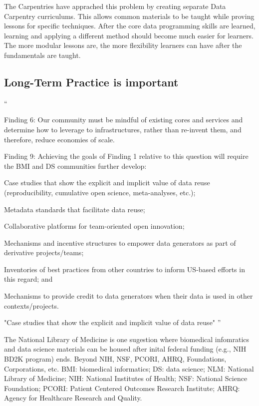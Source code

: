 \documentclass[030-workshop.tex]{subfiles}
\begin{document}
        The Carpentries have apprached this problem by creating separate Data Carpentry curriculums.
        This allows common materials to be taught while proving lessons for specific techniques.
        After the core data programming skills are learned,
        learning and applying a different method should become much easier for learners.
        The more modular lessons are, the more flexibility learners can have after the fundamentals are taught.

    \subsection{Long-Term Practice is important}
    
    ``
    
    Finding 6: Our community must be mindful of existing cores and services and determine how to leverage to infrastructures, rather than re-invent them, and therefore, reduce economies of scale. 
    
    
    Finding 9: Achieving the goals of Finding 1 relative to this question will require the BMI and DS communities further develop:

    Case studies that show the explicit and implicit value of data reuse (reproducibility, cumulative open science, meta-analyses, etc.);

    Metadata standards that facilitate data reuse;

    Collaborative platforms for team-oriented open innovation;

    Mechanisms and incentive structures to empower data generators as part of derivative projects/teams;

    Inventories of best practices from other countries to inform US-based efforts in this regard; and

    Mechanisms to provide credit to data generators when their data is used in other contexts/projects.
    
        "Case studies that show the explicit and implicit value of data reuse" \cite{payneBiomedicalInformaticsMeets2018}
        ''
        
        The National Library of Medicine is one sugestion where biomedical infomratics and data science materials can be housed \cite{payneBiomedicalInformaticsMeets2018} after inital federal funding (e.g., NIH BD2K program) ends.
        Beyond NIH,
        \cite{payneBiomedicalInformaticsMeets2018}
        NSF, PCORI, AHRQ, Foundations, Corporations, etc.
        BMI: biomedical informatics; DS: data science; NLM: National Library of Medicine; NIH: National Institutes of Health; NSF: National Science Foundation; PCORI: Patient Centered Outcomes Research Institute; AHRQ: Agency for Healthcare Research and Quality.
\end{document}
